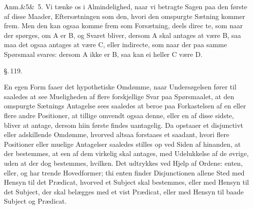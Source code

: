 \documentclass[12pt]{book}
\def\sperr#1{#1}%
\def\textit#1{#1}%
\def\emph#1{#1}%
\newcommand{\sperr}[1]{\textls[180]{#1}}
\newcommand{\parag}[1]{%
  \par\vspace{0.9\baselineskip}%
  {\centering\textit{\S.\,#1.}\par}%
  \vspace{0.35\baselineskip}%
  \noindent\hspace{\parindent}\ignorespaces
}
\newcommand{\anm}[1]{%
  \par\vspace{0.5\baselineskip}%
  \noindent\hspace{\parindent}\sperr{Anm.}\ifx&#1&\else~\textit{#1}.\fi
  \enspace\ignorespaces
}
\newcommand{\opage}[1]{\marginnote{\footnotesize\textit{[#1]}}}
\begin{document}
\anm{5} Vi tænke os i Almindelighed, naar vi betragte Sagen paa den første af
disse Maader, Eftersætningen som den, hvori den omspurgte Sætning kommer frem.
Men den kan ogsaa komme frem som Forsætning, deels direc%
\opage{291}te, som naar der spørges, om \textit{A} er \textit{B}, og Svaret bliver, dersom
\textit{A} skal antages at være \textit{B}, saa maa det ogsaa antages at være
\textit{C}, eller indirecte, som naar der paa samme Spørsmaal svares: dersom
\textit{A} ikke er \textit{B}, saa kan ei heller \textit{C} være \textit{D}.

\parag{119}

En egen Form faaer det hypothetiske Omdømme, naar Undersøgelsen fører til
saaledes at see Mueligheden af flere forskjellige Svar paa Spørsmaalet, at den
omspurgte Sætnings Antagelse sees saaledes at beroe paa Forkastelsen af en eller
flere andre Positioner, at tillige omvendt ogsaa denne, eller en af disse sidste,
bliver at antage, dersom hiin første findes uantagelig. Da opstaaer et
\emph{disjunctivt eller adskillende Omdømme}, hvorved altsaa forstaaes et
saadant, hvori flere Positioner eller muelige Antagelser saaledes stilles op ved
Siden af hinanden, at der bestemmes, at een af dem virkelig skal antages, med
Udelukkelse af de øvrige, uden at der dog bestemmes, hvilken. Det udtrykkes ved
Hjelp af Ordene: \emph{enten, eller}, og har trende Hovedformer; thi enten finder
Disjunctionen allene Sted med Hensyn til det Prædicat, hvorved et Subject skal
bestemmes, eller med Hensyn til det Subject, der skal belægges med et vist
Prædicat, eller med Hensyn til baade Subject og Prædicat.
\end{document}
